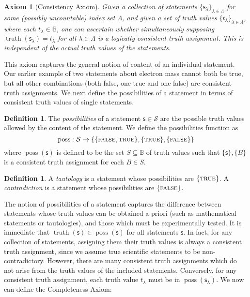 \documentclass[psamsfonts]{amsart}
\newtheorem{axiom}[thm]{Axiom}
\theoremstyle{definition}
\newtheorem{defn}[thm]{Definition}
\theoremstyle{remark}
\numberwithin{equation}{section}
\DeclareMathOperator{\truth}{truth}
\DeclareMathOperator{\possFn}{poss}
\def\TRUE{\textsc{true}}
\def\FALSE{\textsc{false}}
\newcommand{\stmt}[1][s] {\mathsf{#1}}
\begin{document}
\begin{axiom}[Consistency Axiom]
\label{consistent}
Given a collection of statements $\{\stmt_{\lambda}\}_{\lambda\in\Lambda}$ for some (possibly uncountable) index set $\Lambda$, and given a set of truth values $\{t_{\lambda}\}_{\lambda\in\Lambda}$, where each $t_{\lambda}\in\mathbb{B}$, one can ascertain whether simultaneously supposing $\truth(\stmt_{\lambda}) = t_{\lambda}$ for all $\lambda\in\Lambda$ is a logically \emph{consistent truth assignment}. This is independent of the actual truth values of the statements. 
\end{axiom}

This axiom captures the general notion of content of an individual statement. Our earlier example of two statements about electron mass cannot both be true, but all other combinations (both false, one true and one false) are consistent truth assignments. We next define the possibilities of a statement in terms of consistent truth values of single statements.

\begin{defn}
The \emph{possibilities} of a statement $\stmt\in\mathcal{S}$ are the possible truth values allowed by the content of the statement. We define the possibilities function as
$$
\possFn:\mathcal{S}\to\{\{\FALSE,\TRUE\},\{\TRUE\},\{\FALSE\}\}
$$
where $\possFn(\stmt)$ is defined to be the set $S\subseteq\mathbb{B}$ of truth values such that $\{\stmt\},\{B\}$ is a consistent truth assignment for each $B\in S$. 
\end{defn}


\begin{defn}
A \emph{tautology} is a statement whose possibilities are $\{\TRUE\}$. A \emph{contradiction} is a statement whose possibilities are $\{\FALSE\}$.
\end{defn}

The notion of possibilities of a statement captures the difference between statements whose truth values can be obtained a priori (such as mathematical statements or tautologies), and those which must be experimentally tested. It is immediate that $\truth(\stmt)\in\possFn(\stmt)$ for all statements $\stmt$. In fact, for any collection of statements, assigning them their truth values is always a consistent truth assignment, since we assume true scientific statements to be non-contradictory. However, there are many consistent truth assignments which do not arise from the truth values of the included statements. Conversely, for any consistent truth assignment, each truth value $t_{\lambda}$ must be in $\possFn(\stmt_{\lambda})$. We now can define the Completeness Axiom:
\end{document}
